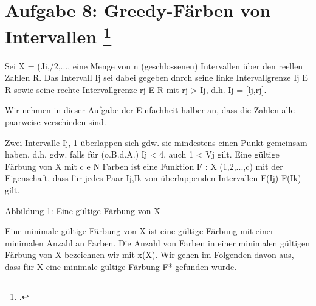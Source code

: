 \documentclass{lehramt-informatik-aufgabe}
\begin{document}

\section{Aufgabe 8: Greedy-Färben von Intervallen
\footcite[Thema 1 Aufgabe 8]{examen:66115:2017:09}}

Sei X = (Ji,/2,..., eine Menge von n (geschlossenen) Intervallen über
den reellen Zahlen R. Das Intervall Ij sei dabei gegeben dnrch seine
linke Intervallgrenze Ij E R sowie seine rechte Intervallgrenze rj E R
mit rj > Ij, d.h. Ij = [lj,rj].

Wir nehmen in dieser Aufgabe der Einfachheit halber an, dass die Zahlen
alle paarweise verschieden sind.

Zwei Intervalle Ij, 1 überlappen sich gdw. sie mindestens einen Punkt
gemeinsam haben, d.h. gdw. falls für (o.B.d.A.) Ij < 4, auch 1 < Vj
gilt. Eine gültige Färbung von X mit c e N Farben ist eine Funktion F :
X  (1,2,...,c) mit der Eigenschaft, dass für jedes Paar Ij,Ik von
überlappenden Intervallen F(Ij)  F(Ik) gilt.

Abbildung 1: Eine gültige Färbung von X

Eine minimale gültige Färbung von X ist eine gültige Färbung mit einer
minimalen Anzahl an Farben. Die Anzahl von Farben in einer minimalen
gültigen Färbung von X bezeichnen wir mit x(X). Wir gehen im Folgenden
davon aus, dass für X eine minimale gültige Färbung F* gefunden wurde.
\end{document}

